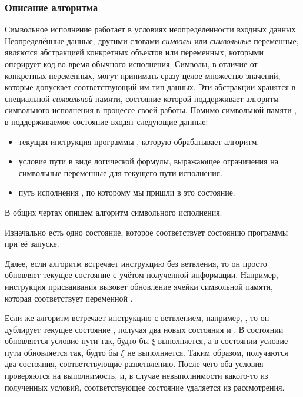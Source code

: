 \subsubsection{Описание алгоритма}\label{sec-sym-exec}

Символьное исполнение работает в условиях неопределенности входных данных. Неопределённые данные, другими словами \textit{символы} или \textit{символьные} переменные, являются абстракцией конкретных объектов или переменных, которыми оперирует код во время обычного исполнения. Символы, в отличие от конкретных переменных, могут принимать сразу целое множество значений, которые допускает соответствующий им тип данных. Эти абстракции хранятся в специальной \textit{символьной} памяти, состояние которой поддерживает алгоритм символьного исполнения в процессе своей работы. Помимо символьной памяти , в поддерживаемое состояние входят следующие данные:

\begin{itemize}
    \item текущая инструкция программы , которую обрабатывает алгоритм.
    \item условие пути  в виде логической формулы, выражающее ограничения на символьные переменные для текущего пути исполнения.
    \item путь исполнения , по которому мы пришли в это состояние.
\end{itemize}

В общих чертах опишем алгоритм символьного исполнения.

Изначально есть одно состояние, которое соответствует состоянию программы при её запуске.

Далее, если алгоритм встречает инструкцию без ветвления, то он просто обновляет текущее состояние с учётом полученной информации. Например, инструкция присваивания  вызовет обновление ячейки символьной памяти, которая соответствует переменной . 

Если же алгоритм встречает инструкцию с ветвлением, например, , то он дублирует текущее состояние , получая два новых состояния  и . В состоянии  обновляется условие пути так, будто бы $\xi$ выполняется, а в состоянии  условие пути обновляется так, будто бы $\xi$ не выполняется. Таким образом, получаются два состояния, соответствующие разветвлению. После чего оба условия проверяются на выполнимость, и, в случае невыполнимости какого-то из полученных условий, соответствующее состояние удаляется из рассмотрения.

